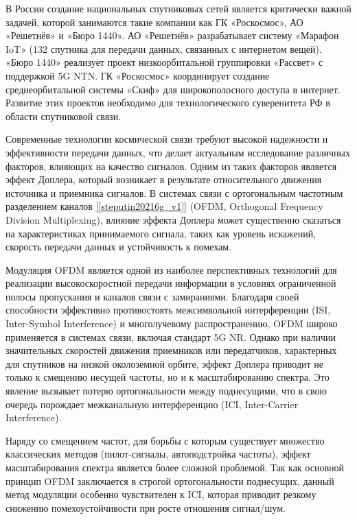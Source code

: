 В России создание национальных спутниковых сетей является критически важной задачей, которой
занимаются такие компании как ГК «Роскосмос»,
АО «Решетнёв» и «Бюро 1440». АО «Решетнёв» разрабатывает систему «Марафон IoT»
(132 спутника для передачи данных, связанных с интернетом вещей).
«Бюро 1440» реализует проект низкоорбитальной группировки «Рассвет» с поддержкой 5G NTN.
ГК «Роскосмос» координирует создание среднеорбитальной системы «Скиф» для широкополосного доступа в интернет.
Развитие этих проектов необходимо для технологического суверенитета РФ в области спутниковой связи.

Современные технологии космической связи требуют высокой надежности и эффективности передачи данных,
что делает актуальным исследование различных факторов, влияющих на качество сигналов.
Одним из таких факторов является эффект Доплера, который возникает в результате относительного
движения источника и приемника сигналов. В системах связи с ортогональным частотным разделением каналов [\ref{steputin20216g_v1}]
(OFDM, Orthogonal Frequency Division Multiplexing), влияние эффекта Доплера может существенно сказаться
на характеристиках принимаемого сигнала, таких как уровень искажений, скорость передачи данных и устойчивость к помехам.

Модуляция OFDM является одной из наиболее перспективных технологий для реализации высокоскоростной передачи
информации в условиях ограниченной полосы пропускания и каналов связи с замираниями.
Благодаря своей способности эффективно противостоять межсимвольной интерференции (ISI, Inter-Symbol Interference)
и многолучевому распространению, OFDM широко применяется в системах связи, включая стандарт 5G NR.
Однако при наличии значительных скоростей движения приемников или передатчиков,
характерных для спутников на низкой околоземной орбите,
эффект Доплера приводит не только к смещению несущей частоты,
но и к масштабированию спектра. Это явление вызывает потерю ортогональности между поднесущими,
что в свою очередь порождает межканальную интерференцию (ICI, Inter-Carrier Interference).

Наряду со смещением частот, для борьбы с которым существует множество классических методов
(пилот-сигналы, автоподстройка частоты), эффект масштабирования спектра является более сложной проблемой.
Так как основной принцип OFDM заключается в строгой ортогональности поднесущих, данный метод модуляции 
особенно чувствителен к ICI, которая приводит резкому снижению помехоустойчи\-вости при росте отношения сигнал/шум.

